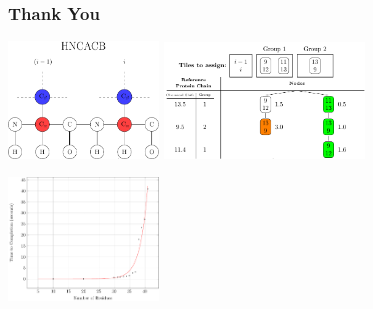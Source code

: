 \documentclass{beamer}
\begin{document}
\begin{frame}
	\frametitle{Thank You} 
	\begin{center}
	\includegraphics[width=0.3\textwidth]{diagram}\hspace{2em}
	\includegraphics[width=0.4\textwidth]{graphic/time_line}
	\end{center}
	\begin{center}
	\includegraphics[width=0.3\textwidth]{plot}\hspace{2em}
	\resizebox{!}{.3\paperheight}{}
\end{center}
\end{frame}
\end{document}
